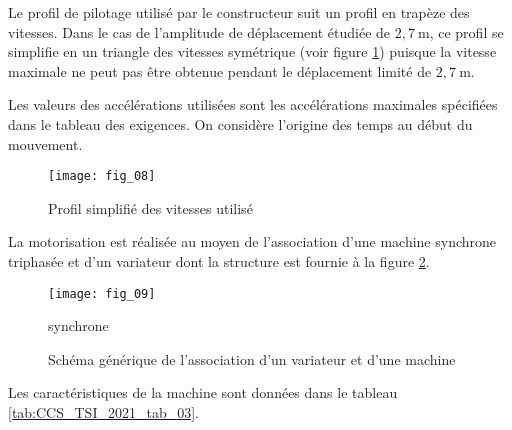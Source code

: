 Le profil de pilotage utilisé par le constructeur suit un profil en trapèze des vitesses. Dans le cas de l'amplitude de déplacement étudiée de $2,7 \mathrm{~m}$, ce profil se simplifie en un triangle des vitesses symétrique (voir figure \ref{fig:CCS_TSI_2021_fig_08}) puisque la vitesse maximale ne peut pas être obtenue pendant le déplacement limité de $2,7 \mathrm{~m}$.

Les valeurs des accélérations utilisées sont les accélérations maximales spécifiées dans le tableau des exigences. On considère l'origine des temps au début du mouvement.


\begin{figure}
\centering
\texttt{[image: fig\_08]}%
\caption{\label{fig:CCS_TSI_2021_fig_08} Profil simplifié des vitesses utilisé}
\end{figure}



La motorisation est réalisée au moyen de l'association d'une machine synchrone triphasée et d'un variateur dont la structure est fournie à la figure \ref{fig:CCS_TSI_2021_fig_09}.


\begin{figure}
\centering
\texttt{[image: fig\_09]}%

\caption{\label{fig:CCS_TSI_2021_fig_09}Schéma générique de l'association d'un variateur et d'une machine} synchrone
\end{figure}

Les caractéristiques de la machine sont données dans le tableau \ref{tab:CCS_TSI_2021_tab_03}.

